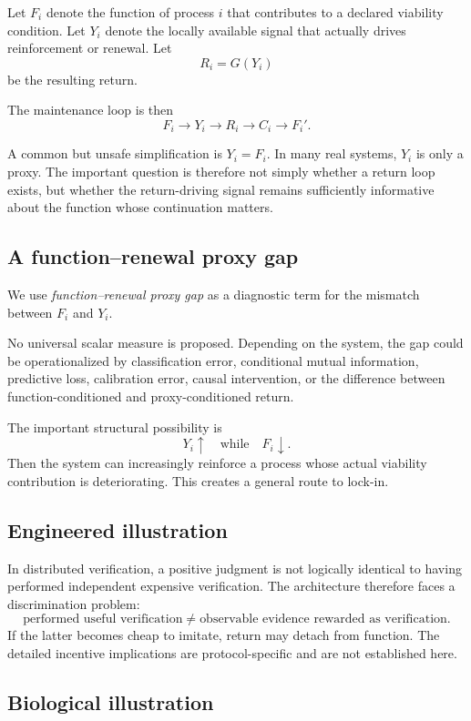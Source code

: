 Let \(F_i\) denote the function of process \(i\) that contributes to a declared viability condition. Let \(Y_i\) denote the locally available signal that actually drives reinforcement or renewal. Let
\[
R_i=G(Y_i)
\]
be the resulting return.

The maintenance loop is then
\[
\boxed{
F_i
\longrightarrow
Y_i
\longrightarrow
R_i
\longrightarrow
C_i
\longrightarrow
F_i'.
}
\]

A common but unsafe simplification is \(Y_i=F_i\). In many real systems, \(Y_i\) is only a proxy. The important question is therefore not simply whether a return loop exists, but whether the return-driving signal remains sufficiently informative about the function whose continuation matters.

\subsection{A function--renewal proxy gap}

We use \emph{function--renewal proxy gap} as a diagnostic term for the mismatch between \(F_i\) and \(Y_i\).

No universal scalar measure is proposed. Depending on the system, the gap could be operationalized by classification error, conditional mutual information, predictive loss, calibration error, causal intervention, or the difference between function-conditioned and proxy-conditioned return.

The important structural possibility is
\[
Y_i\uparrow
\quad\text{while}\quad
F_i\downarrow.
\]
Then the system can increasingly reinforce a process whose actual viability contribution is deteriorating. This creates a general route to lock-in.

\subsection{Engineered illustration}

In distributed verification, a positive judgment is not logically identical to having performed independent expensive verification. The architecture therefore faces a discrimination problem:
\[
\text{performed useful verification}
\neq
\text{observable evidence rewarded as verification}.
\]
If the latter becomes cheap to imitate, return may detach from function. The detailed incentive implications are protocol-specific and are not established here.

\subsection{Biological illustration}

